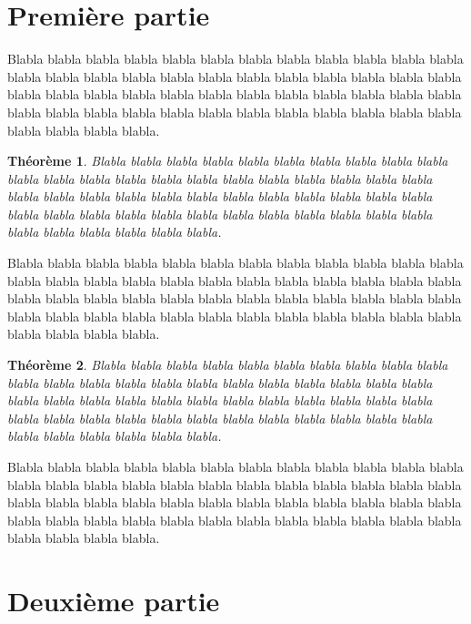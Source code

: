 \documentclass[a4paper]{article}
\newtheorem{theoreme}{Théorème}[section]
\begin{document}
\section{Première partie}

Blabla blabla blabla blabla blabla blabla blabla blabla blabla blabla blabla blabla blabla
blabla blabla blabla blabla blabla blabla blabla blabla blabla blabla blabla blabla blabla
blabla blabla blabla blabla blabla blabla blabla blabla blabla blabla blabla blabla blabla
blabla blabla blabla blabla blabla blabla blabla blabla blabla blabla blabla blabla blabla.


\begin{theoreme}
Blabla blabla blabla blabla blabla blabla blabla blabla blabla blabla blabla blabla blabla
blabla blabla blabla blabla blabla blabla blabla blabla blabla blabla blabla blabla blabla
blabla blabla blabla blabla blabla blabla blabla blabla blabla blabla blabla blabla blabla
blabla blabla blabla blabla blabla blabla blabla blabla blabla blabla blabla blabla blabla.
\end{theoreme}

Blabla blabla blabla blabla blabla blabla blabla blabla blabla blabla blabla blabla blabla
blabla blabla blabla blabla blabla blabla blabla blabla blabla blabla blabla blabla blabla
blabla blabla blabla blabla blabla blabla blabla blabla blabla blabla blabla blabla blabla
blabla blabla blabla blabla blabla blabla blabla blabla blabla blabla blabla blabla blabla.


\begin{theoreme}
Blabla blabla blabla blabla blabla blabla blabla blabla blabla blabla blabla blabla blabla
blabla blabla blabla blabla blabla blabla blabla blabla blabla blabla blabla blabla blabla
blabla blabla blabla blabla blabla blabla blabla blabla blabla blabla blabla blabla blabla
blabla blabla blabla blabla blabla blabla blabla blabla blabla blabla blabla blabla blabla.
\end{theoreme}

Blabla blabla blabla blabla blabla blabla blabla blabla blabla blabla blabla blabla blabla
blabla blabla blabla blabla blabla blabla blabla blabla blabla blabla blabla blabla blabla
blabla blabla blabla blabla blabla blabla blabla blabla blabla blabla blabla blabla blabla
blabla blabla blabla blabla blabla blabla blabla blabla blabla blabla blabla blabla blabla.


\section{Deuxième partie}
\end{document}
